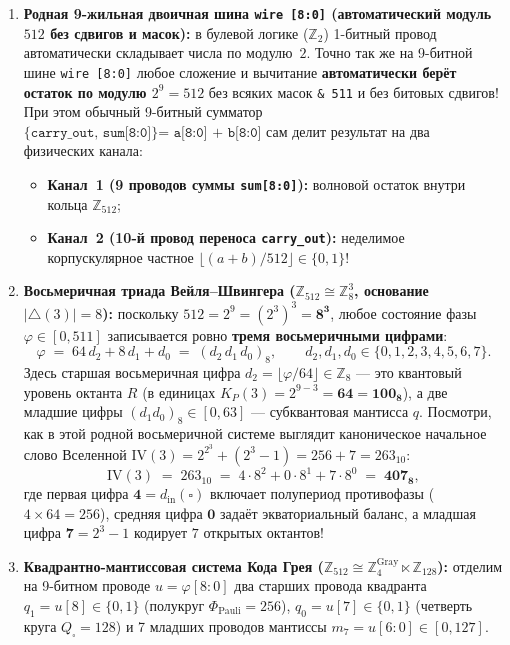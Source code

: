 \begin{enumerate}[label=\textbf{\arabic*.},leftmargin=*]
\item \textbf{Родная 9-жильная двоичная шина \texttt{wire [8:0]} (автоматический модуль $512$ без сдвигов и масок):}
  в булевой логике ($\mathbb{Z}_2$) 1-битный провод автоматически складывает числа по модулю~$2$. Точно так же на 9-битной шине \texttt{wire [8:0]} любое сложение и вычитание \textbf{автоматически берёт остаток по модулю $2^9 = 512$} без всяких масок \texttt{\& 511} и без битовых сдвигов! При этом обычный 9-битный сумматор $\texttt{\{carry\_out, sum[8:0]\} = a[8:0] + b[8:0]}$ сам делит результат на два физических канала:
  \begin{itemize}[noitemsep]
  \item \textbf{Канал~1 (9 проводов суммы \texttt{sum[8:0]}):} волновой остаток внутри кольца $\mathbb{Z}_{512}$;
  \item \textbf{Канал~2 (10-й провод переноса \texttt{carry\_out}):} неделимое корпускулярное частное $\lfloor(a+b)/512\rfloor\in\{0,1\}$!
  \end{itemize}
\item \textbf{Восьмеричная триада Вейля--Швингера ($\mathbb{Z}_{512}\cong\mathbb{Z}_8^3$, основание $|{\triangle}(3)| = 8$):}
  поскольку $512 = 2^9 = (2^3)^3 = \mathbf{8^3}$, любое состояние фазы $\varphi\in[0,511]$ записывается ровно \textbf{тремя восьмеричными цифрами}:
  \[
    \varphi \;=\; 64\,d_2 + 8\,d_1 + d_0 \;=\; (d_2\,d_1\,d_0)_8, \qquad d_2,d_1,d_0\in\{0,1,2,3,4,5,6,7\}.
  \]
  Здесь старшая восьмеричная цифра $d_2 = \lfloor\varphi / 64\rfloor\in\mathbb{Z}_8$ --- это квантовый уровень октанта $R$ (в единицах $K_P(3) = 2^{9-3} = \mathbf{64 = 100_8}$), а две младшие цифры $(d_1 d_0)_8\in[0,63]$ --- субквантовая мантисса $q$.
  Посмотри, как в этой родной восьмеричной системе выглядит каноническое начальное слово Вселенной $\mathrm{IV}(3) = 2^{2^3} + (2^3 - 1) = 256 + 7 = 263_{10}$:
  \begin{equation}
    \label{eq:course-iv-octal}
    \mathrm{IV}(3) \;=\; 263_{10} \;=\; 4\cdot 8^2 + 0\cdot 8^1 + 7\cdot 8^0 \;=\; \mathbf{407_8},
  \end{equation}
  где первая цифра $\mathbf{4} = d_{\mathrm{in}}(\square)$ включает полупериод противофазы ($4\times 64 = 256$), средняя цифра $\mathbf{0}$ задаёт экваториальный баланс, а младшая цифра $\mathbf{7} = 2^3 - 1$ кодирует $7$ открытых октантов!
\item \textbf{Квадрантно-мантиссовая система Кода Грея ($\mathbb{Z}_{512}\cong\mathbb{Z}_4^{\mathrm{Gray}}\ltimes\mathbb{Z}_{128}$):}
  отделим на 9-битном проводе $u = \varphi[8:0]$ два старших провода квадранта $q_1 = u[8]\in\{0,1\}$ (полукруг $\Phi_{\mathrm{Pauli}}=256$), $q_0 = u[7]\in\{0,1\}$ (четверть круга $Q_\square = 128$) и 7 младших проводов мантиссы $m_7 = u[6:0]\in[0,127]$.
\end{enumerate}

